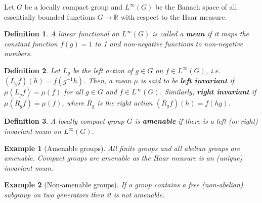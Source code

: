 \documentclass[12pt]{article}
\newcommand*{\Rset}{\mathbb{R}}
\theoremstyle{inlinedefn}
\newtheorem{definition}{Definition}
\theoremstyle{break}
\newtheorem{example}{Example}
\begin{document}
Let $G$ be a locally compact group and $L^\infty(G)$ be the Banach space of all essentially bounded functions $G \to \Rset$ with respect to the Haar measure.

\begin{definition}
A linear functional on $L^\infty(G)$ is called a \textbf{mean} if it maps the constant function $f(g) = 1$ to 1 and non-negative functions to non-negative numbers.
\end{definition}

\begin{definition}
Let $L_g$ be the left action of $g \in G$ on $f \in L^\infty(G)$,
i.e.\ $(L_g f)(h) = f(g^{-1}h)$.
Then, a mean $\mu$ is said to be \textbf{left invariant} if $\mu(L_g f) = \mu(f)$
for all $g \in G$ and $f \in L^\infty(G)$.
Similarly, \textbf{right invariant} if $\mu(R_g f) = \mu(f)$,
where $R_g$ is the right action $(R_g f)(h) = f(hg)$.
\end{definition}

\begin{definition}
A locally compact group $G$ is \textbf{amenable} if there is a left (or right) invariant mean on $L^\infty(G)$.
\end{definition}

\begin{example}[Amenable groups]
All finite groups and all abelian groups are amenable.
Compact groups are amenable as the Haar measure is an (unique) invariant mean.
\end{example}

\begin{example}[Non-amenable groups]
If a group contains a free (non-abelian) subgroup on two generators then it is not amenable.
\end{example}
\end{document}
